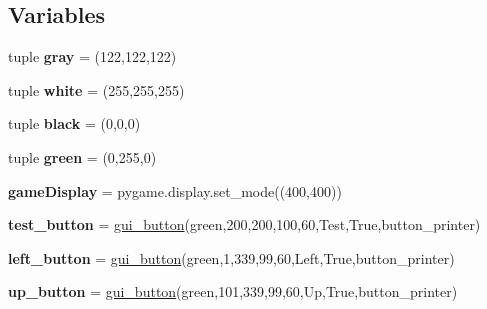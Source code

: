 \subsection*{Variables}
\begin{DoxyCompactItemize}
\item 
\mbox{\label{namespacebutton__tester_a465cca23f1caa514c2b0ee54ce21d1cc}} 
tuple {\bfseries gray} = (122,122,122)
\item 
\mbox{\label{namespacebutton__tester_abb6f89d2ee785d66310e7e97aa855b9c}} 
tuple {\bfseries white} = (255,255,255)
\item 
\mbox{\label{namespacebutton__tester_a7070ba4e5732e6887011e3341806ee9f}} 
tuple {\bfseries black} = (0,0,0)
\item 
\mbox{\label{namespacebutton__tester_a4829d0f548081fbef92d1507a64cedf4}} 
tuple {\bfseries green} = (0,255,0)
\item 
\mbox{\label{namespacebutton__tester_a2af2914076ee061dfa131ec906840ca9}} 
{\bfseries game\+Display} = pygame.\+display.\+set\+\_\+mode((400,400))
\item 
\mbox{\label{namespacebutton__tester_ac604dc5db7e7b625cb698c14dd4c57a2}} 
{\bfseries test\+\_\+button} = \hyperlink{class_buttons_1_1gui__button}{gui\+\_\+button}(green,200,200,100,60,\textquotesingle{}Test\textquotesingle{},True,button\+\_\+printer)
\item 
\mbox{\label{namespacebutton__tester_aa408325b33d93a7538fb5602029cfd7b}} 
{\bfseries left\+\_\+button} = \hyperlink{class_buttons_1_1gui__button}{gui\+\_\+button}(green,1,339,99,60,\textquotesingle{}Left\textquotesingle{},True,button\+\_\+printer)
\item 
\mbox{\label{namespacebutton__tester_a945d3174459bc1798e1de5a419a44388}} 
{\bfseries up\+\_\+button} = \hyperlink{class_buttons_1_1gui__button}{gui\+\_\+button}(green,101,339,99,60,\textquotesingle{}Up\textquotesingle{},True,button\+\_\+printer)
\item 
\mbox{\label{namespacebutton__tester_a233aef93e7006a8292d2517ee0317853}} 

\end{DoxyCompactItemize}
